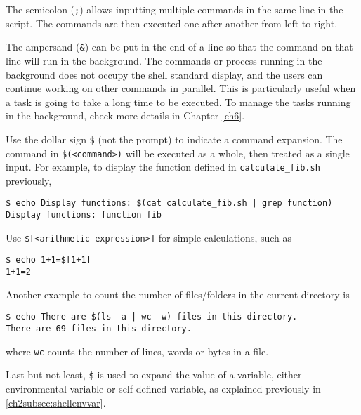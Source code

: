 The semicolon (\verb|;|) allows inputting multiple commands in the same line in the script. The commands are then executed one after another from left to right.

The ampersand (\verb|&|) can be put in the end of a line so that the command on that line will run in the background. The commands or process running in the background does not occupy the shell standard display, and the users can continue working on other commands in parallel. This is particularly useful when a task is going to take a long time to be executed. To manage the tasks running in the background, check more details in Chapter \ref{ch6}.

Use the dollar sign \verb|$| (not the prompt) to indicate a command expansion. The command in \verb|$(<command>)| will be executed as a whole, then treated as a single input. For example, to display the function defined in \verb|calculate_fib.sh| previously,
\begin{lstlisting}
$ echo Display functions: $(cat calculate_fib.sh | grep function)
Display functions: function fib
\end{lstlisting}
Use \verb|$[<arithmetic expression>]| for simple calculations, such as
\begin{lstlisting}
$ echo 1+1=$[1+1]
1+1=2
\end{lstlisting}

Another example to count the number of files/folders in the current directory is
\begin{lstlisting}
$ echo There are $(ls -a | wc -w) files in this directory.
There are 69 files in this directory.
\end{lstlisting}
where \verb|wc| counts the number of lines, words or bytes in a file.

Last but not least, \verb|$| is used to expand the value of a variable, either environmental variable or self-defined variable, as explained previously in \ref{ch2subsec:shellenvvar}.
